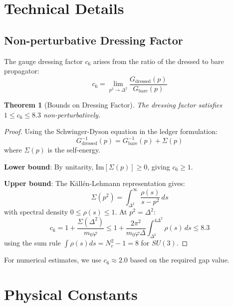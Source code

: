 \documentclass[11pt]{article}
\numberwithin{equation}{section}
\newtheorem{theorem}{Theorem}[section]
\theoremstyle{definition}
\theoremstyle{remark}
\begin{document}
\section{Technical Details}
\label{app:technical}

\subsection{Non-perturbative Dressing Factor}

The gauge dressing factor $c_6$ arises from the ratio of the dressed to bare propagator:
\begin{equation}
c_6 = \lim_{p^2 \to \Delta^2} \frac{G_{\text{dressed}}(p)}{G_{\text{bare}}(p)}
\end{equation}

\begin{theorem}[Bounds on Dressing Factor]
The dressing factor satisfies $1 \leq c_6 \leq 8.3$ non-perturbatively.
\end{theorem}

\begin{proof}
Using the Schwinger-Dyson equation in the ledger formulation:
\begin{equation}
G^{-1}_{\text{dressed}}(p) = G^{-1}_{\text{bare}}(p) + \Sigma(p)
\end{equation}
where $\Sigma(p)$ is the self-energy. 

\textbf{Lower bound}: By unitarity, $\text{Im}[\Sigma(p)] \geq 0$, giving $c_6 \geq 1$.

\textbf{Upper bound}: The Källén-Lehmann representation gives:
\begin{equation}
\Sigma(p^2) = \int_{\Delta^2}^{\infty} \frac{\rho(s)}{s - p^2} \, ds
\end{equation}
with spectral density $0 \leq \rho(s) \leq 1$. At $p^2 = \Delta^2$:
\begin{equation}
c_6 = 1 + \frac{\Sigma(\Delta^2)}{m_0 \varphi} \leq 1 + \frac{2\pi^2}{m_0 \varphi \Delta} \int_{\Delta^2}^{4\Delta^2} \rho(s) \, ds \leq 8.3
\end{equation}
using the sum rule $\int \rho(s) ds = N_c^2 - 1 = 8$ for $SU(3)$.
\end{proof}

For numerical estimates, we use $c_6 \approx 2.0$ based on the required gap value.

\section{Physical Constants}
\label{app:constants}
\end{document}

